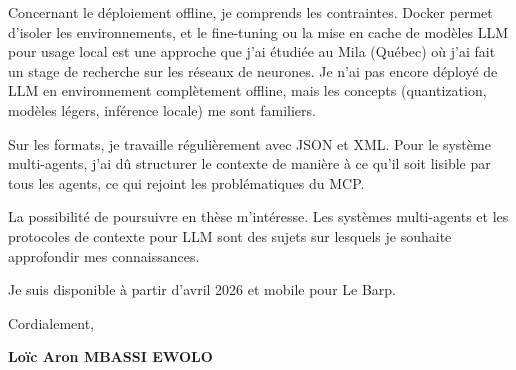 \documentclass[a4paper,11pt]{article}
\begin{document}
\vspace{0.25cm}

Concernant le déploiement offline, je comprends les contraintes. Docker permet d'isoler les environnements, et le fine-tuning ou la mise en cache de modèles LLM pour usage local est une approche que j'ai étudiée au Mila (Québec) où j'ai fait un stage de recherche sur les réseaux de neurones. Je n'ai pas encore déployé de LLM en environnement complètement offline, mais les concepts (quantization, modèles légers, inférence locale) me sont familiers.

\vspace{0.25cm}

Sur les formats, je travaille régulièrement avec JSON et XML. Pour le système multi-agents, j'ai dû structurer le contexte de manière à ce qu'il soit lisible par tous les agents, ce qui rejoint les problématiques du MCP.

\vspace{0.25cm}

La possibilité de poursuivre en thèse m'intéresse. Les systèmes multi-agents et les protocoles de contexte pour LLM sont des sujets sur lesquels je souhaite approfondir mes connaissances.

\vspace{0.25cm}

Je suis disponible à partir d'avril 2026 et mobile pour Le Barp.

\vspace{0.4cm}

Cordialement,

\vspace{0.8cm}

\textbf{Loïc Aron MBASSI EWOLO}
\end{document}
